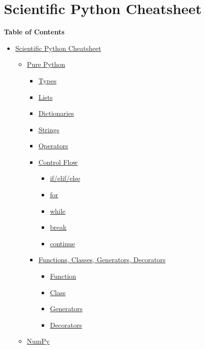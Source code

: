 \documentclass[10pt,a4paperpaper,twocolumn]{article}
\date{}
\providecommand{\tightlist}{%
  \setlength{\itemsep}{0pt}\setlength{\parskip}{0pt}}
\begin{document}
\hypertarget{scientific-python-cheatsheet}{\section{Scientific Python
Cheatsheet}\label{scientific-python-cheatsheet}}

\textbf{Table of Contents}

\begin{itemize}
\tightlist
\item
  \protect\hyperlink{scientific-python-cheatsheet}{Scientific Python
  Cheatsheet}

  \begin{itemize}
  \tightlist
  \item
    \protect\hyperlink{pure-python}{Pure Python}

    \begin{itemize}
    \tightlist
    \item
      \protect\hyperlink{types}{Types}
    \item
      \protect\hyperlink{lists}{Lists}
    \item
      \protect\hyperlink{dictionaries}{Dictionaries}
    \item
      \protect\hyperlink{strings}{Strings}
    \item
      \protect\hyperlink{operators}{Operators}
    \item
      \protect\hyperlink{control-flow}{Control Flow}

      \begin{itemize}
      \tightlist
      \item
        \protect\hyperlink{ifelifelse}{if/elif/else}
      \item
        \protect\hyperlink{for}{for}
      \item
        \protect\hyperlink{while}{while}
      \item
        \protect\hyperlink{break}{break}
      \item
        \protect\hyperlink{continue}{continue}
      \end{itemize}
    \item
      \protect\hyperlink{functions-classes-generators-decorators}{Functions,
      Classes, Generators, Decorators}

      \begin{itemize}
      \tightlist
      \item
        \protect\hyperlink{function}{Function}
      \item
        \protect\hyperlink{class}{Class}
      \item
        \protect\hyperlink{generators}{Generators}
      \item
        \protect\hyperlink{decorators}{Decorators}
      \end{itemize}
    \end{itemize}
  \item
    \protect\hyperlink{numpy}{NumPy}


\end{itemize}
\end{itemize}
\end{document}
